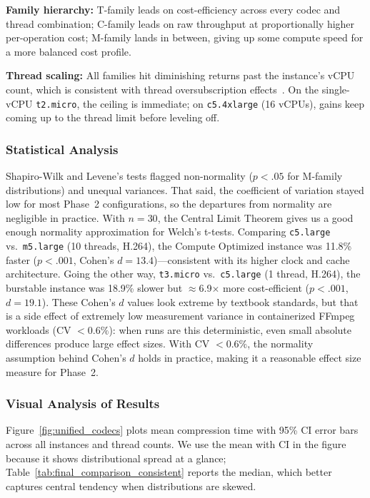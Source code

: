 \documentclass[conference]{IEEEtran}
\begin{document}
\textbf{Family hierarchy:} T-family leads on cost-efficiency across every codec and thread combination; C-family leads on raw throughput at proportionally higher per-operation cost; M-family lands in between, giving up some compute speed for a more balanced cost profile.

\textbf{Thread scaling:} All families hit diminishing returns past the instance's vCPU count, which is consistent with thread oversubscription effects~\cite{b1}. On the single-vCPU \texttt{t2.micro}, the ceiling is immediate; on \texttt{c5.4xlarge} (16 vCPUs), gains keep coming up to the thread limit before leveling off.

\subsubsection{Statistical Analysis}

Shapiro-Wilk and Levene's tests flagged non-normality ($p < .05$ for M-family distributions) and unequal variances. That said, the coefficient of variation stayed low for most Phase~2 configurations, so the departures from normality are negligible in practice. With $n=30$, the Central Limit Theorem gives us a good enough normality approximation for Welch's t-tests. Comparing \texttt{c5.large} vs.\ \texttt{m5.large} (10 threads, H.264), the Compute Optimized instance was 11.8\% faster ($p < .001$, Cohen's $d = 13.4$)---consistent with its higher clock and cache architecture. Going the other way, \texttt{t3.micro} vs.\ \texttt{c5.large} (1 thread, H.264), the burstable instance was 18.9\% slower but $\approx$6.9$\times$ more cost-efficient ($p < .001$, $d = 19.1$). These Cohen's $d$ values look extreme by textbook standards, but that is a side effect of extremely low measurement variance in containerized FFmpeg workloads (CV $< 0.6\%$): when runs are this deterministic, even small absolute differences produce large effect sizes. With CV $< 0.6\%$, the normality assumption behind Cohen's $d$ holds in practice, making it a reasonable effect size measure for Phase~2.

\subsubsection{Visual Analysis of Results}

Figure~\ref{fig:unified_codecs} plots mean compression time with 95\% CI error bars across all instances and thread counts. We use the mean with CI in the figure because it shows distributional spread at a glance; Table~\ref{tab:final_comparison_consistent} reports the median, which better captures central tendency when distributions are skewed.
\end{document}

